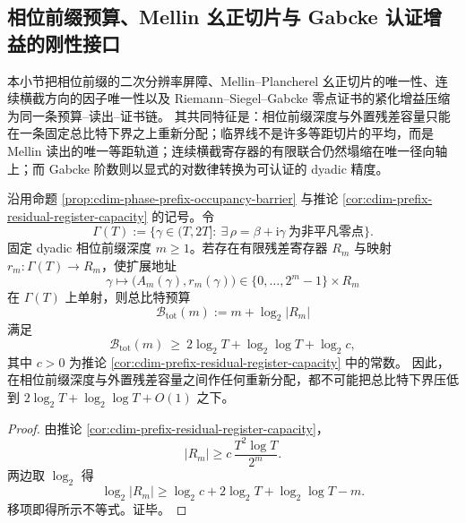 \subsection{相位前缀预算、Mellin 幺正切片与 Gabcke 认证增益的刚性接口}\label{subsec:conclusion-phase-prefix-mellin-transverse-gabcke-rigidity}
本小节把相位前缀的二次分辨率屏障、Mellin--Plancherel 幺正切片的唯一性、连续横截方向的因子唯一性以及 Riemann--Siegel--Gabcke 零点证书的紧化增益压缩为同一条预算--读出--证书链。
其共同特征是：相位前缀深度与外置残差容量只能在一条固定总比特下界之上重新分配；临界线不是许多等距切片的平均，而是 Mellin 读出的唯一等距轨道；连续横截寄存器的有限联合仍然塌缩在唯一径向轴上；而 Gabcke 阶数则以显式的对数律转换为可认证的 dyadic 精度。

\begin{theorem}[地址--残差总比特预算守恒律]\label{thm:conclusion-address-residual-total-bit-budget}
沿用命题 \ref{prop:cdim-phase-prefix-occupancy-barrier} 与推论 \ref{cor:cdim-prefix-residual-register-capacity} 的记号。令
\[
\Gamma(T):=\{\gamma\in(T,2T]:\ \exists\,\rho=\beta+\mathrm{i}\gamma\ \text{为非平凡零点}\}.
\]
固定 dyadic 相位前缀深度 \(m\ge 1\)。若存在有限残差寄存器 \(R_m\) 与映射 \(r_m:\Gamma(T)\to R_m\)，使扩展地址
\[
\gamma\longmapsto \bigl(A_m(\gamma),r_m(\gamma)\bigr)\in \{0,\dots,2^m-1\}\times R_m
\]
在 \(\Gamma(T)\) 上单射，则总比特预算
\[
\mathcal B_{\mathrm{tot}}(m):=m+\log_2|R_m|
\]
满足
\[
\boxed{\;
\mathcal B_{\mathrm{tot}}(m)\ \ge\ 2\log_2 T+\log_2\log T+\log_2 c,\;}
\]
其中 \(c>0\) 为推论 \ref{cor:cdim-prefix-residual-register-capacity} 中的常数。
因此，在相位前缀深度与外置残差容量之间作任何重新分配，都不可能把总比特下界压低到
\(
2\log_2 T+\log_2\log T+O(1)
\)
之下。
\end{theorem}
\begin{proof}
由推论 \ref{cor:cdim-prefix-residual-register-capacity}，
\[
|R_m|\ge c\,\frac{T^2\log T}{2^m}.
\]
两边取 \(\log_2\) 得
\[
\log_2|R_m|
\ge
\log_2 c+2\log_2 T+\log_2\log T-m.
\]
移项即得所示不等式。证毕。
\end{proof}

